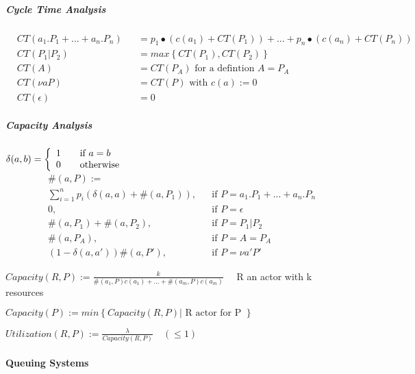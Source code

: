 \documentclass[a4paper,12pt,smallheadings]{scrartcl}
\begin{document}
\subparagraph{Cycle Time Analysis}
\begin{align*}
&CT\left(a_1.P_1+...+a_n.P_n\right)&&= p_1\bullet\left(c\left(a_1\right)+CT\left(P_1\right)\right)+...+p_n\bullet\left(c\left(a_n\right)+CT\left(P_n\right)\right) \\
&CT\left(P_1|P_2\right) &&= max\left\lbrace CT\left(P_1\right), CT\left(P_2\right)\right\rbrace \\
&CT\left(A\right) &&= CT\left(P_A\right) \text{ for a defintion } A = P_A \\
&CT\left(\nu a P\right) &&= CT\left(P\right) \text{ with } c\left(a\right) := 0 \\
&CT\left(\epsilon\right) &&= 0
\end{align*}

\subparagraph{Capacity Analysis} \hfill

\begin{math}
\delta(a,b) = \left\lbrace
	\begin{array}{l l}
		1 & \quad \text{if } a=b \\
		0 & \quad \text{otherwise}
	\end{array} \right.
\end{math}
\begin{align*}
&\#\left(a,P\right) := \\
&\sum_{i=1}^{n} p_i\left(\delta\left(a,a\right)+\#\left(a,P_1\right)\right),& &\text{if } P=a_1.P_1+...+a_n.P_n \\
&0,& &\text{if } P=\epsilon \\
&\#\left(a,P_1\right) + \#\left(a,P_2\right),& &\text{if } P=P_1|P_2 \\
&\#\left(a,P_A\right), & &\text{if } P = A = P_A \\
&\left(1-\delta\left(a,a'\right)\right) \#\left(a,P'\right),& &\text{if } P = \nu a' P'
\end{align*}

$Capacity\left(R,P\right) := \frac{k}{\#\left(a_1,P\right)c\left(a_1\right) + ... + \#\left(a_m,P\right)c\left(a_m\right)} \quad$ R an actor with k resources

$Capacity\left(P\right):= min\left\lbrace Capacity\left(R,P\right) | \text{ R actor for P }\right\rbrace$

$Utilization \left( R,P\right) := \frac{\lambda}{Capacity \left(R,P\right)} \quad \left( \leq 1\right)$

\paragraph{Queuing Systems}
\end{document}
